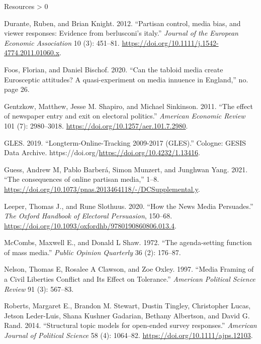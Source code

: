 \documentclass[
  ignorenonframetext,
]{beamer}
\newlength{\cslhangindent}
\newenvironment{CSLReferences}[2] %
 {%
  \setlength{\parindent}{0pt}
  \ifodd #1 \everypar{\setlength{\hangindent}{\cslhangindent}}\ignorespaces\fi
  \ifnum #2 > 0
  \setlength{\parskip}{#2\baselineskip}
  \fi
 }%
 {}
\begin{document}
\begin{frame}[allowframebreaks]{Resources}
\begin{CSLReferences}{1}{0}
\leavevmode\hypertarget{ref-Durante2012}{}%
Durante, Ruben, and Brian Knight. 2012. {``{Partisan control, media
bias, and viewer responses: Evidence from berlusconi's italy}.''}
\emph{Journal of the European Economic Association} 10 (3): 451--81.
\url{https://doi.org/10.1111/j.1542-4774.2011.01060.x}.

\leavevmode\hypertarget{ref-Foos2020}{}%
Foos, Florian, and Daniel Bischof. 2020. {``{Can the tabloid media
create Eurosceptic attitudes? A quasi-experiment on media innuence in
England},''} no. page 26.

\leavevmode\hypertarget{ref-Gentzkow2011}{}%
Gentzkow, Matthew, Jesse M. Shapiro, and Michael Sinkinson. 2011.
{``{The effect of newspaper entry and exit on electoral politics}.''}
\emph{American Economic Review} 101 (7): 2980--3018.
\url{https://doi.org/10.1257/aer.101.7.2980}.

\leavevmode\hypertarget{ref-GLES2019LongTermTracking}{}%
GLES. 2019. {``{Longterm-Online-Tracking 2009-2017 (GLES)}.''} Cologne:
GESIS Data Archive.
https://doi.org/\url{https://doi.org/10.4232/1.13416}.

\leavevmode\hypertarget{ref-Guess2021}{}%
Guess, Andrew M, Pablo Barberá, Simon Munzert, and Junghwan Yang. 2021.
{``{The consequences of online partisan media},''} 1--8.
\url{https://doi.org/10.1073/pnas.2013464118/-/DCSupplemental.y}.

\leavevmode\hypertarget{ref-Leeper2020}{}%
Leeper, Thomas J., and Rune Slothuus. 2020. {``{How the News Media
Persuades}.''} \emph{The Oxford Handbook of Electoral Persuasion},
150--68. \url{https://doi.org/10.1093/oxfordhb/9780190860806.013.4}.

\leavevmode\hypertarget{ref-McCombs1972}{}%
McCombs, Maxwell E., and Donald L Shaw. 1972. {``{The agenda-setting
function of mass media}.''} \emph{Public Opinion Quarterly} 36 (2):
176--87.

\leavevmode\hypertarget{ref-Nelson1997}{}%
Nelson, Thomas E, Rosalee A Clawson, and Zoe Oxley. 1997. {``{Media
Framing of a Civil Liberties Conflict and Its Effect on Tolerance}.''}
\emph{American Political Science Review} 91 (3): 567--83.

\leavevmode\hypertarget{ref-Roberts2014}{}%
Roberts, Margaret E., Brandon M. Stewart, Dustin Tingley, Christopher
Lucas, Jetson Leder-Luis, Shana Kushner Gadarian, Bethany Albertson, and
David G. Rand. 2014. {``{Structural topic models for open-ended survey
responses}.''} \emph{American Journal of Political Science} 58 (4):
1064--82. \url{https://doi.org/10.1111/ajps.12103}.


\end{CSLReferences}
\end{frame}
\end{document}
